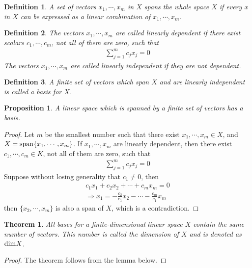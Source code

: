 \documentclass[11pt]{book}
\newtheorem{definition}{Definition}[section]
\newtheorem{theorem}{Theorem}[section]
\newtheorem{proposition}{Proposition}[section]
\theoremstyle{definition}
\numberwithin{equation}{chapter}
\begin{document}
\begin{definition}
A set of vectors $x_1,\cdots, x_m$ in $X$ spans the whole space $X$ if every $x$ in $X$ can be expressed as a linear combination of $x_1,\cdots, x_m$.
\end{definition}

\begin{definition}
The vectors $x_1,\cdots, x_m$ are called linearly dependent if there exist scalars $c_1,\cdots, c_m$, not all of them are zero, such that
\begin{align*}
    \sum^m_{j=1} c_j x_j = 0
\end{align*}
The vectors $x_1,\cdots, x_m$ are called linearly independent if they are not dependent. 
\end{definition}

\begin{definition}
A finite set of vectors which span $X$ and are linearly independent is called a basis for $X$.
\end{definition}

\medskip

\begin{proposition}
A linear space which is spanned by a finite set of vectors has a basis.
\end{proposition}
\begin{proof}
Let $m$ be the smallest number such that there exist $x_1,\cdots,x_m \in X$, and $X = {\rm span}\{x_1,\cdots,x_m\}$. If $x_1,\cdots,x_m$ are linearly dependent, then there exist $c_1,\cdots,c_m\in K$, not all of them are zero, such that
\begin{align*}
    \sum^m_{j=1}c_j x_j = 0
\end{align*}
Suppose without losing generality that $c_1 \neq 0$, then 
\begin{align*}
    c_1 x_1 + c_2 x_2 + \cdots + c_m x_m = 0\\
    \Rightarrow x_1 = -\frac{c_2}{c_1}x_2 - \cdots - \frac{c_m}{c_1}x_m
\end{align*}
then $\{x_2,\cdots,x_m\}$ is also a span of $X$, which is a contradiction.
\end{proof}

\medskip

\begin{theorem}
All bases for a finite-dimensional linear space $X$ contain the
same number of vectors. This number is called the dimension of $X$ and is denoted as ${\rm dim} X$.
\end{theorem}
\begin{proof}
The theorem follows from the lemma below.
\end{proof}
\end{document}

